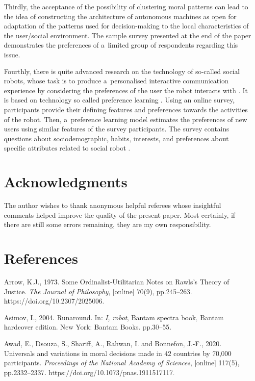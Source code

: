 Thirdly, the acceptance of the possibility of clustering moral patterns can lead to the idea of constructing the architecture of autonomous machines as open for adaptation of the patterns used for decision-making to the local characteristics of the user/social environment. The sample survey presented at the end of the paper demonstrates the preferences of a~limited group of respondents regarding this issue.

Fourthly, there is quite advanced research on the technology of so-called social robots, whose task is to produce a~personalised interactive communication experience by considering the preferences of the user the robot interacts with
\parencite[][]{maroto-gomez_adaptive_2022}. %
 It is based on technology so called preference learning 
\parencite[][]{furnkranz_preference_2011}. %
 Using an online survey, participants provide their defining features and preferences towards the activities of the robot. Then, a~preference learning model estimates the preferences of new users using similar features of the survey participants. The survey contains questions about sociodemographic, habits, interests, and preferences about specific attributes related to social robot 
\parencite[][p.2]{furnkranz_preference_2011}.%


\section*{Acknowledgments }
The author wishes to thank anonymous helpful referees whose insightful comments helped improve the quality of the present paper. Most certainly, if there are still some errors remaining, they are my own responsibility.

\section*{References}
Arrow, K.J., 1973. Some Ordinalist-Utilitarian Notes on Rawls's Theory of Justice. \textit{The Journal of Philosophy}, [online] 70(9), pp.245–263. https://doi.org/10.2307/2025006.

Asimov, I., 2004. Runaround. In: \textit{I, robot}, Bantam spectra book, Bantam hardcover edition. New York: Bantam Books. pp.30–55.

Awad, E., Dsouza, S., Shariff, A., Rahwan, I. and Bonnefon, J.-F., 2020. Universals and variations in moral decisions made in 42 countries by 70,000 participants. \textit{Proceedings of the National Academy of Sciences}, [online] 117(5), pp.2332–2337. https://doi.org/10.1073/pnas.1911517117.

